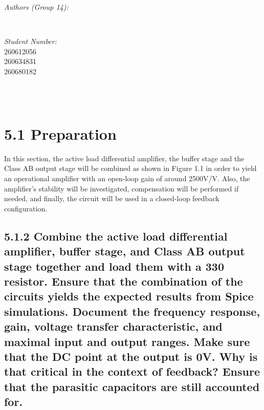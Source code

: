 \documentclass[12pt]{article}
\makeatletter
\let\theauthor\@author
\let\thedate\@date
\makeatother
\begin{document}
\begin{titlepage}
\begin{minipage}{0.4\textwidth}
\begin{flushleft}
            \emph{Authors (Group 14):}\\
            \theauthor
            \end{flushleft}
            \end{minipage}~
            \begin{minipage}{0.4\textwidth}
            \begin{flushright} \large
            \emph{Student Number:} \\
            260612056 \\ 260634831 \\ 260680182                                  %
        \end{flushright}
    \end{minipage}\\[2 cm]
 
    {\large \thedate}\\[2 cm]
 
    \vfill
    
\end{titlepage}


\section*{5.1 Preparation}

In this section, the active load differential amplifier, the buffer stage and the Class AB 
output stage will be combined as shown in Figure 1.1 in order to yield an operational 
amplifier with an open-loop gain of around 2500V/V. Also, the amplifier’s stability will 
be investigated, compensation will be performed if needed, and finally, the circuit will 
be used in a closed-loop feedback configuration.

\subsection*{5.1.2 Combine the active load differential amplifier, buffer stage, and 
Class AB output stage together and load them with a 330 \Omega resistor. Ensure that the 
combination of the circuits yields the expected results from Spice simulations. Document 
the frequency response, gain, voltage transfer characteristic, and maximal input and 
output ranges. Make sure that the DC point at the output is 0V. Why is that critical in 
the context of feedback? Ensure that the parasitic capacitors are still accounted for. }
\end{document}

